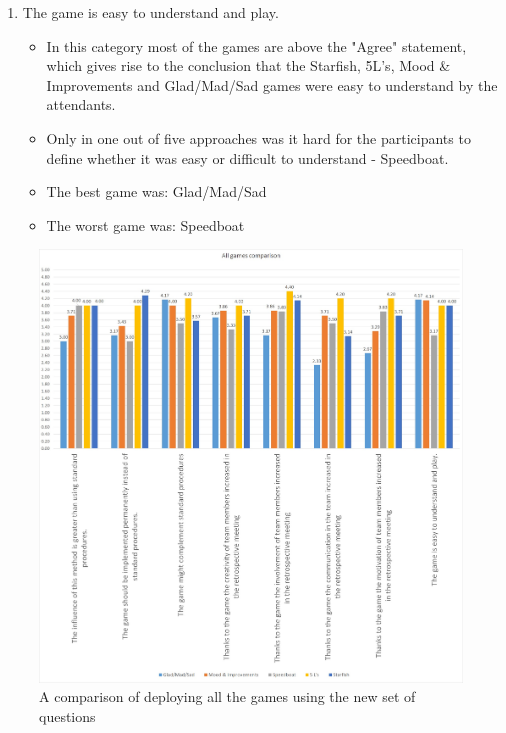 \begin{enumerate}
\begin{itemize}
    \end{itemize}
    \item The game is easy to understand and play.
    \begin{itemize}
        \item In this category most of the games are above the "Agree" statement, which gives rise to the conclusion that the Starfish, 5L's, Mood \& Improvements and Glad/Mad/Sad games were easy to understand by the attendants.
        \item Only in one out of five approaches was it hard for the participants to define whether it was easy or difficult to understand - Speedboat.
        \item The best game was: Glad/Mad/Sad
        \item The worst game was: Speedboat
    \end{itemize}
\end{enumerate}

\begin{figure}[!htbp]
\caption{A comparison of deploying all the games using the new set of questions}
\label{fig:allGamesResultsNew}
\centering
\includegraphics[width=1.1\textwidth]{charts/allGamesComp}
\end{figure}

